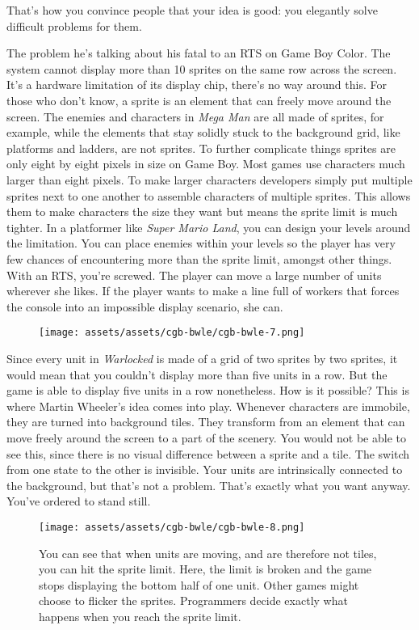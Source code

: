 \documentclass{book}
\begin{document}
That’s how you convince people that your idea is good: you elegantly solve difficult problems for them.

The problem he’s talking about his fatal to an RTS on Game Boy Color. The system cannot display more than 10 sprites on the same row across the screen. It’s a hardware limitation of its display chip, there’s no way around this. For those who don’t know, a sprite is an element that can freely move around the screen. The enemies and characters in \emph{Mega Man} are all made of sprites, for example, while the elements that stay solidly stuck to the background grid, like platforms and ladders, are not sprites. To further complicate things sprites are only eight by eight pixels in size on Game Boy. Most games use characters much larger than eight pixels. To make larger characters developers simply put multiple sprites next to one another to assemble characters of multiple sprites. This allows them to make characters the size they want but means the sprite limit is much tighter. In a platformer like \emph{Super Mario Land}, you can design your levels around the limitation. You can place enemies within your levels so the player has very few chances of encountering more than the sprite limit, amongst other things. With an RTS, you’re screwed. The player can move a large number of units wherever she likes. If the player wants to make a line full of workers that forces the console into an impossible display scenario, she can.

\begin{figure}[hbt]
\vskip 10pt
\centering \texttt{[image: assets/assets/cgb-bwle/cgb-bwle-7.png]}
\vskip 6pt
\end{figure}

Since every unit in \emph{Warlocked} is made of a grid of two sprites by two sprites, it would mean that you couldn’t display more than five units in a row. But the game is able to display five units in a row nonetheless. How is it possible? This is where Martin Wheeler’s idea comes into play. Whenever characters are immobile, they are turned into background tiles. They transform from an element that can move freely around the screen to a part of the scenery. You would not be able to see this, since there is no visual difference between a sprite and a tile. The switch from one state to the other is invisible. Your units are intrinsically connected to the background, but that’s not a problem. That’s exactly what you want anyway. You’ve ordered to stand still.

\begin{figure}[hbt]
\vskip 10pt
\centering \texttt{[image: assets/assets/cgb-bwle/cgb-bwle-8.png]}\par\pagetwodescription You can see that when units are moving, and are therefore not tiles, you can hit the sprite limit. Here, the limit is broken and the game stops displaying the bottom half of one unit. Other games might choose to flicker the sprites. Programmers decide exactly what happens when you reach the sprite limit.
\vskip 6pt
\end{figure}
\end{document}
